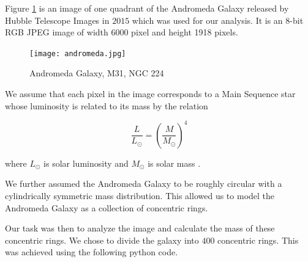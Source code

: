 Figure \ref{andromedaimage} is an image of one quadrant of the Andromeda Galaxy released by Hubble Telescope Images in $2015$ which was used for our analysis. It is an 8-bit RGB JPEG image of width 6000 pixel and height 1918 pixels.
    
\begin{figure}[h!]
   \centering
   \texttt{[image: andromeda.jpg]}
   \caption{Andromeda Galaxy, M31, NGC 224}
   \label{andromedaimage}
\end{figure}

We assume that each pixel in the image corresponds to a Main Sequence star whose luminosity is related to its mass by the relation 

\begin{equation}
\frac{L}{L_{\odot}} = (\frac{M}{M_{\odot}})^4 
\end{equation}

where $L_{\odot}$ is solar luminosity and $M_{\odot}$ is solar mass \cite{LMratio}.

We further assumed the Andromeda Galaxy to be roughly circular with a cylindrically symmetric mass distribution. This allowed us to model the Andromeda Galaxy as a collection of concentric rings. 

Our task was then to analyze the image and calculate the mass of these concentric rings. We chose to divide the galaxy into $400$ concentric rings. This was achieved using the following python code.

